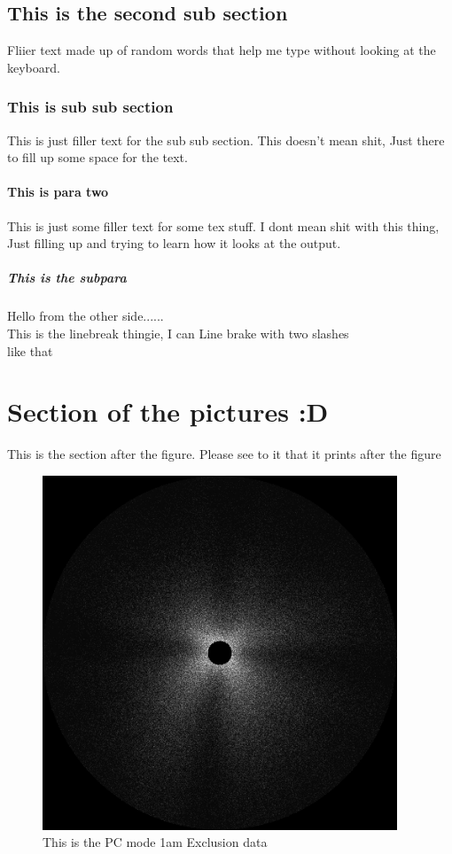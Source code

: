 \documentclass[a4paper,13pt]{article}
\numberwithin{equation}{section}
\begin{document}
\subsection{This is the second sub section}
Fliier text made up of random words that help me type without looking at the keyboard.
\subsubsection{This is sub sub section}
This is just filler text for the sub sub section. This doesn't mean shit, Just there to fill up some space for the text.
\paragraph{This is para two}
This is just some filler text for some tex stuff. I dont mean shit with this thing, Just filling up and trying to learn how it looks at the output.
\subparagraph{This is the subpara}
Hello from the other side......\\
This is the linebreak thingie, I can Line brake with two slashes \\ like that
\section{Section of the pictures :D}
This is the section after the figure. Please see to it that it prints after the figure
\begin{figure}
  \includegraphics[width=400]{PCP4_1am.jpg}
  \caption{This is the PC mode 1am Exclusion data}
  \label{fig:PC_1am}
\end{figure}
\end{document}
